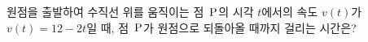 원점을 출발하여 수직선 위를 움직이는 점~$\mathrm{P}$의 시각 $t$에서의 속도 $v(t)$가 $v(t)=12-2t$일 때, 점~$\mathrm{P}$가 원점으로 되돌아올 때까지 걸리는 시간은?
